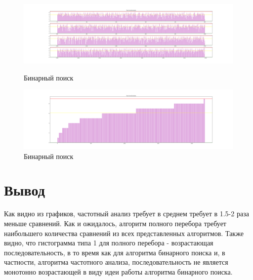 \begin{landscape}
	\begin{figure}[H]
		\centering
		\includegraphics[width=0.95\linewidth]{assets/frequency_keys.png}
		\caption{Бинарный поиск}
		\label{fig:frequency_cmps}
		
		\centering
		\includegraphics[width=0.95\linewidth]{assets/frequency_cmps.png}
		\caption{Бинарный поиск}
		\label{fig:frequency_keys}
	\end{figure}
\end{landscape}

\section{Вывод}\label{sec:exp-sum}
Как видно из графиков, частотный анализ требует в среднем тре­бует в 1.5-2 раза меньше сравнений. Как и ожидалось, алгоритм полного перебора требует наибольшего количества сравнений из всех представ­ленных алгоритмов.
Также видно, что гистограмма типа 1 для полного перебора - воз­растающая последовательность, в то время как для алгоритма бинарно­го поиска и, в частности, алгоритма частотного анализа, последователь­ность не является монотонно возрастающей в виду идеи работы алгорит­ма бинарного поиска.